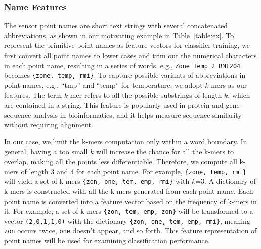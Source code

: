 
\subsubsection{Name Features}
The sensor point names are short text strings with several concatenated abbreviations, as shown in our motivating example in Table~\ref{table:ex}. 
To represent the primitive point names as feature vectors for classifier training, we first convert all point names to lower cases and trim out the numerical characters in each point name, resulting in a series of words, e.g., \texttt{Zone Temp 2 RMI204} becomes \texttt{\{zone, temp, rmi\}}. 
To capture possible variants of abbreviations in point names, e.g., ``tmp'' and ``temp'' for temperature, we adopt $k$-mers \cite{leslie2004mismatch} as our features. 
The term $k$-mer refers to all the possible substrings of length $k$, which are contained in a string. This feature is popularly used in protein and gene sequence analysis in bioinformatics, and it helps measure sequence similarity without requiring alignment. 

In our case, we limit the k-mers computation only within a word boundary.
In general, having a too small $k$ will increase the chance for all the k-mers to overlap, making all the points less differentiable.
Therefore, we compute all k-mers of length 3 and 4 for each point name.
For example, \texttt{\{zone, temp, rmi\}} will yield a set of k-mers \texttt{\{zon, one, tem, emp, rmi\}} with $k$=3.
A dictionary of k-mers is constructed with all the k-mers generated from each point name. 
Each point name is converted into a feature vector based on the frequency of k-mers in it. 
For example, a set of k-mers \texttt{\{zon, tem, emp, zon\}} will be transformed to a vector
\texttt{(2,0,1,1,0)} with the dictionary \texttt{\{zon, one, tem, emp, rmi\}}, meaning \texttt{zon} occurs twice, \texttt{one} doesn't appear, and so forth. 
This feature representation of point names will be used for examining classification performance.


